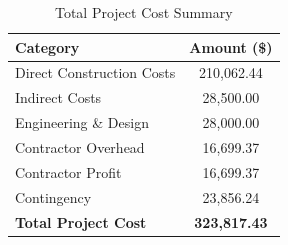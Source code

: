 \documentclass[letterpaper,12pt]{report} %
\begin{document}
\begin{table}[H]
\centering
\caption{Total Project Cost Summary}
\label{tab:appendix_total_cost}
\begin{tabular}{l c}
\toprule
\textbf{Category} & \textbf{Amount (\$)} \\
\midrule
Direct Construction Costs & 210,062.44 \\
Indirect Costs            & 28,500.00  \\
Engineering \& Design     & 28,000.00  \\
Contractor Overhead       & 16,699.37  \\
Contractor Profit         & 16,699.37  \\
Contingency               & 23,856.24  \\
\midrule
\textbf{Total Project Cost} & \textbf{323,817.43} \\
\bottomrule
\end{tabular}
\end{table}



\end{document}
